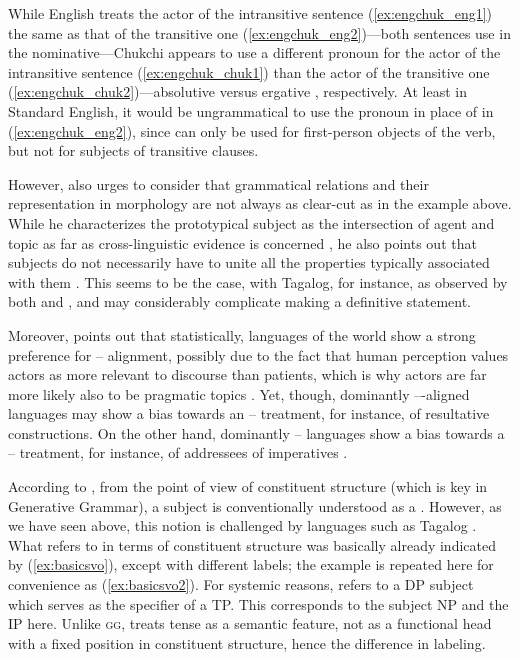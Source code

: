 While English treats the actor of the intransitive sentence
(\ref{ex:engchuk_eng1}) the same as that of the transitive one
(\ref{ex:engchuk_eng2})---both sentences use  in the nominative---Chukchi
appears to use a different pronoun for the actor of the intransitive sentence
(\ref{ex:engchuk_chuk1}) than the actor of the transitive one
(\ref{ex:engchuk_chuk2})---absolutive  versus ergative ,
respectively. At least in Standard English, it would be ungrammatical to use
the pronoun  in place of  in (\ref{ex:engchuk_eng2}), since
 can only be used for first-person objects of the verb, but not for
subjects of transitive clauses.

However, \citet{comrie1989} also urges to consider that grammatical relations
and their representation in morphology are not always as clear-cut as in the
example above. While he characterizes the prototypical subject as the
intersection of agent and topic as far as cross-linguistic evidence is
concerned \citep[107]{comrie1989}, he also points out that subjects do not
necessarily have to unite all the properties typically associated with them
\citep[110]{comrie1989}. This seems to be the case, with Tagalog, for instance,
as observed by both \citet{schachter1976} and \citet{kroeger1991}, and may
considerably complicate making a definitive statement.

Moreover, \citet{comrie1989} points out that statistically, languages of the
world show a strong preference for \Nom{}--\Acc{} alignment, possibly due to
the fact that human perception values actors as more relevant to discourse than
patients, which is why actors are far more likely also to be pragmatic topics
\citep[120]{comrie1989}. Yet, though, dominantly \Nom{}--\Acc{}-aligned
languages may show a bias towards an \Erg{}--\Abs{} treatment, for instance, of
resultative constructions. On the other hand, dominantly \Erg{}--\Abs{}
languages show a bias towards a \Nom{}--\Acc{} treatment, for instance, of
addressees of imperatives \citep[116--119]{comrie1989}.

According to \citet{carnie2013}, from the point of view of constituent
structure (which is key in Generative Grammar), a subject is conventionally
understood as a . However, as
we have seen above, this notion is challenged by languages such as Tagalog
\citep[225]{kroeger1991}. What \citet{carnie2013} refers to in terms of
constituent structure was basically already indicated by (\ref{ex:basicsvo}),
except with different labels; the example is repeated here for convenience as
(\ref{ex:basicsvo2}). For systemic reasons, \citet{carnie2013} refers to a DP
subject which serves as the specifier of a TP. This corresponds to the subject
NP and the IP here. Unlike \textsc{gg}, \Lfg{} treats tense as a semantic
feature, not as a functional head with a fixed position in constituent
structure, hence the difference in labeling.


